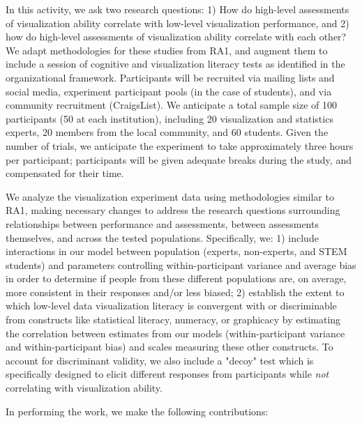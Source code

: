 \documentclass[11pt]{article}
\begin{document}
In this activity, we ask two research questions: 1) How do high-level assessments of visualization ability correlate with low-level visualization performance, and 2) how do high-level assessments of visualization ability correlate with each other?
We adapt methodologies for these studies from RA1, and augment them to include a session of cognitive and visualization literacy tests as identified in the organizational framework.
Participants will be recruited via mailing lists and social media, experiment participant pools (in the case of students), and via community recruitment (\eg CraigsList).
We anticipate a total sample size of 100 participants (50 at each institution), including 20 visualization and statistics experts, 20 members from the local community, and 60 students.
Given the number of trials, we anticipate the experiment to take approximately three hours per participant; participants will be given adequate breaks during the study, and compensated for their time.

\figratwo

We analyze the visualization experiment data using methodologies similar to RA1, making necessary changes to address the research questions surrounding relationships between performance and assessments, between assessments themselves, and across the tested populations.
Specifically, we:
1) include interactions in our model between population (experts, non-experts, and STEM students) and parameters controlling within-participant variance and average bias in order to determine if people from these different populations are, on average, more consistent in their responses and/or less biased;
2) establish the extent to which low-level data visualization literacy is convergent with or discriminable from constructs like statistical literacy, numeracy, or graphicacy by estimating the correlation between estimates from our models (\eg within-participant variance and within-participant bias) and scales measuring these other constructs. To account for discriminant validity, we also include a "decoy" test which is specifically designed to elicit different responses from participants while \emph{not} correlating with visualization ability. 

In performing the work, we make the following contributions:
\end{document}
